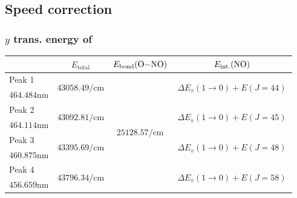 \documentclass[aspectratio=1610,scheme=plain]{ctexbeamer}
\begin{document}
	\subsection{Speed correction}
		\subsubsection{$y$ trans. energy of }
	\begin{frame}{\insertsubsection}{\insertsubsubsection}
		\begin{table}[htbp]
			\centering
			\tiny
			\begin{tabularx}{0.9\textwidth}{lccc}
				\toprule
				& $E_\text{total}$ & $E_\text{bond}(\ce{O-NO})$ \footfullcite{ono}& $E_\text{int.}(\ce{NO})$ \\
				\midrule
				Peak 1 & \multirow{2}[2]{*}{$\num{43058.49}\unit{\per \centi \meter}$} & \multirow{8}[8]{*}{$\num{25128.57}\unit{\per \centi \meter}$} & \multirow{2}[2]{*}{\quad\quad\,$\Delta E_v (1\rightarrow 0)+ E( J = 44 )$\quad\quad\,} \\
				$\num{464.484}\unit{\nano\meter}$ & & & \\
				\cmidrule{1-2}\cmidrule{4-4}
				Peak 2 & \multirow{2}[2]{*}{$\num{43092.81}\unit{\per \centi \meter}$} & & \multirow{2}[2]{*}{\quad\quad\,$\Delta E_v (1\rightarrow 0)+ E( J = 45 )$\quad\quad\,} \\
				$\num{464.114}\unit{\nano\meter}$ & & & \\
				\cmidrule{1-2}\cmidrule{4-4}
				Peak 3 & \multirow{2}[2]{*}{$\num{43395.69}\unit{\per \centi \meter}$} & & \multirow{2}[2]{*}{\quad\quad\,$\Delta E_v (1\rightarrow 0)+ E( J = 48 )$\quad\quad\,} \\
				$\num{460.875}\unit{\nano\meter}$ & & & \\
				\cmidrule{1-2}\cmidrule{4-4}
				Peak 4 & \multirow{2}[2]{*}{$\num{43796.34}\unit{\per \centi \meter}$} & & \multirow{2}[2]{*}{\quad\quad\,$\Delta E_v (1\rightarrow 0)+ E( J = 58 )$\quad\quad\,} \\
				$\num{456.659}\unit{\nano\meter}$ & & & \\
				\bottomrule
			\end{tabularx}
		\end{table}
	\end{frame}
\end{document}
